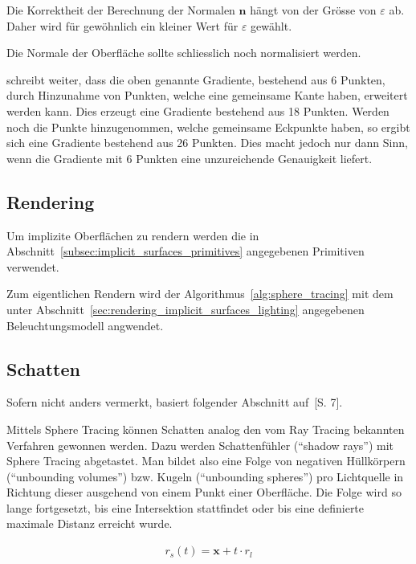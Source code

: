 Die Korrektheit der Berechnung der Normalen $\bm{n}$ hängt von der
Grösse von $\varepsilon$ ab. Daher wird für gewöhnlich ein kleiner Wert
für $\varepsilon$ gewählt.

Die Normale der Oberfläche sollte schliesslich noch normalisiert werden.

\cite{hart_ray_1989} schreibt weiter, dass die oben genannte Gradiente,
bestehend aus 6 Punkten, durch Hinzunahme von Punkten, welche eine
gemeinsame Kante haben, erweitert werden kann. Dies erzeugt eine
Gradiente bestehend aus 18 Punkten. Werden noch die Punkte
hinzugenommen, welche gemeinsame Eckpunkte haben, so ergibt sich eine
Gradiente bestehend aus 26 Punkten.
Dies macht jedoch nur dann Sinn, wenn die Gradiente mit 6 Punkten eine
unzureichende Genauigkeit liefert.

\subsection{Rendering}
\label{sec:rendering_implicit_surfaces_Rendering}

Um implizite Oberflächen zu rendern werden die in
Abschnitt~\ref{subsec:implicit_surfaces_primitives} angegebenen
Primitiven verwendet.

Zum eigentlichen Rendern wird der Algorithmus~\ref{alg:sphere_tracing}
mit dem unter Abschnitt~\ref{sec:rendering_implicit_surfaces_lighting}
angegebenen Beleuchtungsmodell angwendet.

\subsection{Schatten}
\label{sec:rendering_implicit_surfaces_shadows}

Sofern nicht anders vermerkt, basiert folgender Abschnitt
auf~\cite{reiner_smi_2011}[S. 7].

Mittels Sphere Tracing können Schatten analog den vom Ray Tracing
bekannten Verfahren gewonnen werden. Dazu werden Schattenfühler
(``shadow rays'') mit Sphere Tracing abgetastet. Man bildet also eine
Folge von negativen Hüllkörpern (``unbounding volumes'') bzw. Kugeln
(``unbounding spheres'') pro Lichtquelle in Richtung dieser ausgehend
von einem Punkt einer Oberfläche. Die Folge wird so lange fortgesetzt,
bis eine Intersektion stattfindet oder bis eine definierte maximale
Distanz erreicht wurde.

\begin{gather}
    r_{s}(t) = \bm{x} + t \cdot r_{l}
\end{gather}

